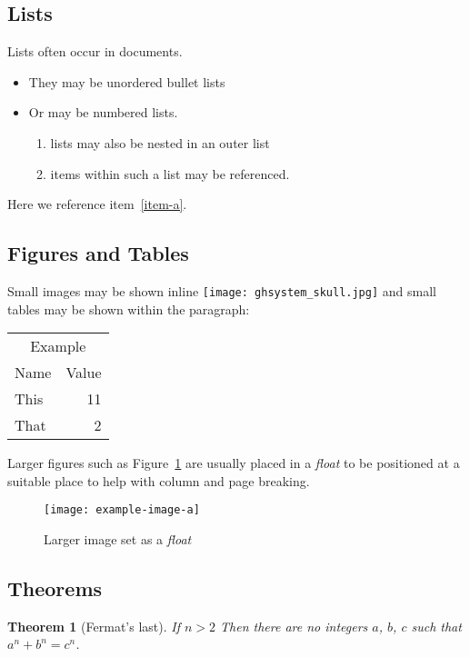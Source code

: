 \documentclass[a4paper,twocolumn]{article}
\newtheorem{theorem}{Theorem}
\providecommand\tagpdfsetup[1]{}
\begin{document}
\subsection{Lists}
Lists often occur in documents.
\begin{itemize}
\item They may be unordered bullet lists
\item Or may be numbered lists.
  \begin{enumerate}
  \item lists may also be nested in an outer list
  \item \label{item-a}items within such a list may be referenced.
  \end{enumerate}
\end{itemize}
Here we reference item~\ref{item-a}.

\subsection{Figures and Tables}

Small images may be shown inline
\texttt{[image: ghsystem\_skull.jpg]}
and small tables may be shown within the paragraph:
\begin{center}
\tagpdfsetup{table/header-rows={1,2}}
\begin{tabular}{lr}
\multicolumn{2}{c}{Example}\\
Name&Value\\
This& 11 \\
That & 2
\end{tabular}
\end{center}

Larger
figures such as Figure~\ref{float} are usually placed in a
\emph{float} to be positioned at a suitable place to help with column
and page breaking.
\begin{figure}
  \centering
  \texttt{[image: example-image-a]}
  \caption{\label{float}Larger image set as a \emph{float}}
\end{figure}

\subsection{Theorems}

\begin{theorem}[Fermat's last]
 If $n>2$ Then there are no integers $a$, $b$, $c$ such that $a^n+b^n=c^n$.
\end{theorem}
\end{document}
